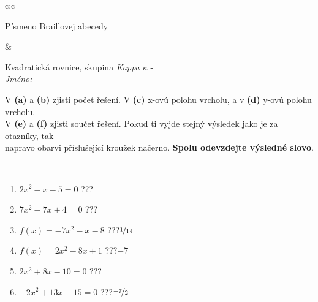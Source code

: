 \documentclass[10pt]{report}
\begin{document}
\begin{tabular}{c:c}
\begin{minipage}[c][104.5mm][t]{0.5\linewidth}
\begin{center}
\begin{minipage}{0.20\linewidth}
\begin{center}
{\small Písmeno Braillovej abecedy}
\end{center}
\end{minipage}
\end{center}
\end{minipage}
&
\begin{minipage}[c][104.5mm][t]{0.5\linewidth}
\begin{center}
\vspace{7mm}
{\huge Kvadratická rovnice, skupina \textit{Kappa $\kappa$} -}\\[5mm]
\textit{Jméno:}\phantom{xxxxxxxxxxxxxxxxxxxxxxxxxxxxxxxxxxxxxxxxxxxxxxxxxxxxxxxxxxxxxxxxx}\\[5mm]
\begin{minipage}{0.95\linewidth}
\begin{center}
V \textbf{(a)} a \textbf{(b)} zjisti počet řešení. V \textbf{(c)} x-ovú polohu vrcholu, a v \textbf{(d)} y-ovú polohu vrcholu.\\V \textbf{(e)} a \textbf{(f)} zjisti součet řešení. Pokud ti vyjde stejný výsledek jako je za otazníky, tak\\napravo obarvi příslušející kroužek načerno. \textbf{Spolu odevzdejte výsledné slovo}.
\end{center}
\end{minipage}
\\[1mm]
\begin{minipage}{0.79\linewidth}
\begin{center}
\begin{varwidth}{\linewidth}
\begin{enumerate}
\Large
\item $2x^2-x-5=0$\quad \dotfill\; ???\;\dotfill {}
\item $7x^2-7x+4=0$\quad \dotfill\; ???\;\dotfill {}
\item $f(x)=-7x^2-x-8$\quad \dotfill\; ???\;\dotfill \quad $\nicefrac{1}{14}$
\item $f(x)=2x^2-8x+1$\quad \dotfill\; ???\;\dotfill \quad $-7$
\item $2x^2+8x-10=0$\quad \dotfill\; ???\;\dotfill {}
\item $-2x^2+13x-15=0$\quad \dotfill\; ???\;\dotfill \quad $\nicefrac{-7}{2}$
\end{enumerate}
\end{varwidth}
\end{center}
\end{minipage}
\begin{minipage}{0.20\linewidth}
\begin{center}

\end{center}
\end{minipage}
\end{center}
\end{minipage}
\end{tabular}
\end{document}
